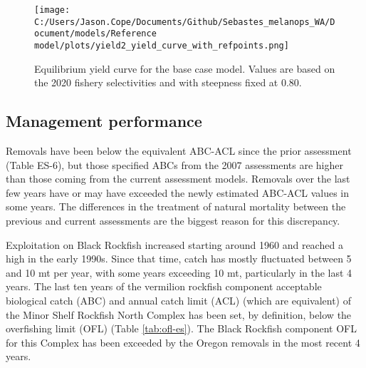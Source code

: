 \documentclass[11pt,
  english,
  letterpaper,
]{article}
\begin{document}
\begin{figure}
\centering
\texttt{[image: C:/Users/Jason.Cope/Documents/Github/Sebastes\_melanops\_WA/Document/models/Reference model/plots/yield2\_yield\_curve\_with\_refpoints.png]}
\caption{Equilibrium yield curve for the base case model. Values are based on the 2020 fishery selectivities and with steepness fixed at 0.80.\label{fig:es-yield}}
\end{figure}



\clearpage

\hypertarget{management-performance}{%
\subsection*{Management performance}\label{management-performance}}

Removals have been below the equivalent ABC-ACL since the prior assessment (Table ES-6), but those specified ABCs from the 2007 assessments are higher than those coming from the current assessment models. Removals over the last few years have or may have exceeded the newly estimated ABC-ACL values in some years. The differences in the treatment of natural mortality between the previous and current assessments are the biggest reason for this discrepancy.

Exploitation on Black Rockfish increased starting around 1960 and reached a high in the early 1990s. Since that time, catch has mostly fluctuated between 5 and 10 mt per year, with some years exceeding 10 mt, particularly in the last 4 years. The last ten years of the vermilion rockfish component acceptable biological catch (ABC) and annual catch limit (ACL) (which are equivalent) of the Minor Shelf Rockfish North Complex has been set, by definition, below the overfishing limit (OFL) (Table \ref{tab:ofl-es}). The Black Rockfish component OFL for this Complex has been exceeded by the Oregon removals in the most recent 4 years.

\begingroup\fontsize{10}{12}\selectfont
\begingroup\fontsize{10}{12}\selectfont
\end{document}
